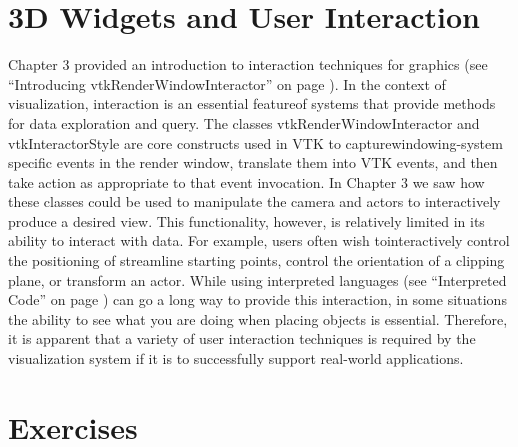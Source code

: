 	\section{3D Widgets and User Interaction}
	\label{sec:3dwui}
	Chapter 3 provided an introduction to interaction techniques for graphics (see ``Introducing vtkRenderWindowInteractor'' on page \pageref{pg:rwi} ).
	In the context of visualization, interaction is an essential featureof systems that provide methods for data exploration and query. The classes
	vtkRenderWindowInteractor and vtkInteractorStyle are core constructs used in VTK to capturewindowing-system specific events in the render window, translate them into VTK events, and then take action as appropriate to that event invocation.
	In Chapter 3 we saw how these classes could be used to manipulate the camera and actors to interactively produce a desired view. This functionality,
	however, is relatively limited in its ability to interact with data. For example, users often wish tointeractively control the positioning of streamline starting points, control the orientation of a clipping plane, or transform an actor. While using interpreted languages (see ``Interpreted Code'' on page \pageref{pg:rwi} ) can go a long way to provide this interaction, in some situations the ability to see what you are doing when placing objects is essential. Therefore, it is apparent that a variety of user interaction techniques is required by the visualization system if it is to successfully support real-world applications.



\section{Exercises}
	
